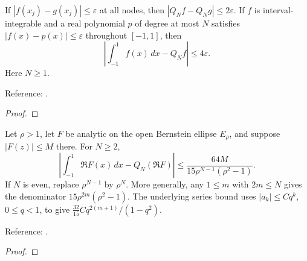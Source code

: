 \begin{theorem}
\label{thm:clenshaw-curtis-positive-error}
\leanok
If $|f(x_j)-g(x_j)|\le\varepsilon$ at all nodes, then
$|Q_Nf-Q_Ng|\le2\varepsilon$. If $f$ is interval-integrable and a real polynomial
$p$ of degree at most $N$ satisfies $|f(x)-p(x)|\le\varepsilon$ throughout
$[-1,1]$, then
\[
 \left|\int_{-1}^1f(x)\,dx-Q_Nf\right|\le4\varepsilon.
\]
Here $N\ge1$.

Reference: \cite[proof of Theorem 19.3]{atap}.
\end{theorem}
\begin{proof}
\leanok
\end{proof}

\begin{theorem}
\label{thm:cc-sharp-analytic}
\leanok
Let $\rho>1$, let $F$ be analytic on the open Bernstein ellipse $E_\rho$,
and suppose $|F(z)|\le M$ there. For $N\ge2$,
\[
 \left|\int_{-1}^1\Re F(x)\,dx-Q_N(\Re F)\right|
 \le \frac{64M}{15\rho^{N-1}(\rho^2-1)}.
\]
If $N$ is even, replace $\rho^{N-1}$ by $\rho^N$.
More generally, any $1\le m$ with $2m\le N$ gives the denominator
$15\rho^{2m}(\rho^2-1)$. The underlying series bound uses
$|a_k|\le Cq^k$, $0\le q<1$, to give
$\frac{32}{15}Cq^{2(m+1)}/(1-q^2)$.

Reference: \cite[Theorem 19.3, equation (19.7)]{atap}.
\end{theorem}
\begin{proof}
\leanok
\end{proof}

